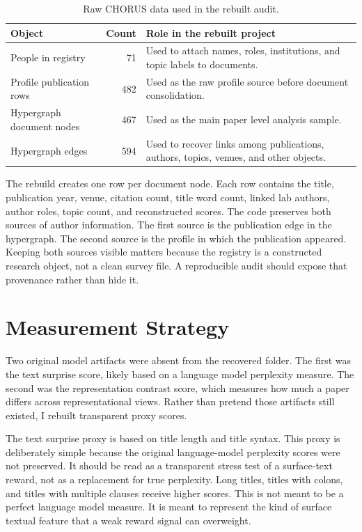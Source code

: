 \documentclass[11pt]{article}
\begin{document}
\begin{table}[H]
\centering
\begin{tabular}{lrp{8.0cm}}
\toprule
Object & Count & Role in the rebuilt project \\
\midrule
People in registry & 71 & Used to attach names, roles, institutions, and topic labels to documents. \\
Profile publication rows & 482 & Used as the raw profile source before document consolidation. \\
Hypergraph document nodes & 467 & Used as the main paper level analysis sample. \\
Hypergraph edges & 594 & Used to recover links among publications, authors, topics, venues, and other objects. \\
\bottomrule
\end{tabular}
\caption{Raw CHORUS data used in the rebuilt audit.}
\end{table}

The rebuild creates one row per document node. Each row contains the title,
publication year, venue, citation count, title word count, linked lab authors,
author roles, topic count, and reconstructed scores. The code preserves both
sources of author information. The first source is the publication edge in the
hypergraph. The second source is the profile in which the publication appeared.
Keeping both sources visible matters because the registry is a constructed
research object, not a clean survey file. A reproducible audit should expose
that provenance rather than hide it.

\section{Measurement Strategy}

Two original model artifacts were absent from the recovered folder. The first
was the text surprise score, likely based on a language model perplexity
measure. The second was the representation contrast score, which measures how much a paper differs across representational views. Rather
than pretend those artifacts still existed, I rebuilt transparent proxy scores.

The text surprise proxy is based on title length and title syntax. This proxy is deliberately simple because the original language-model perplexity scores were not preserved. It should be read as a transparent stress test of a surface-text reward, not as a replacement for true perplexity. Long titles,
titles with colons, and titles with multiple clauses receive higher scores. This
is not meant to be a perfect language model measure. It is meant to represent
the kind of surface textual feature that a weak reward signal can overweight.
\end{document}
